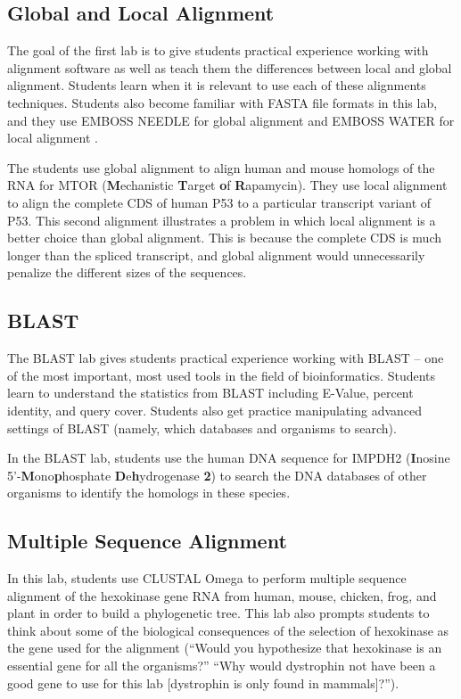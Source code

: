 \documentclass{report}
\begin{document}
\subsection{Global and Local Alignment}
The goal of the first lab is to give students practical experience working with alignment software as well as teach them the differences between local and global alignment. Students learn when it is relevant to use each of these alignments techniques. Students also become familiar with FASTA file formats in this lab, and they use EMBOSS NEEDLE for global alignment and EMBOSS WATER for local alignment \cite{rice2000emboss}.

The students use global alignment to align human and mouse homologs of the RNA for MTOR (\textbf{M}echanistic \textbf{T}arget \textbf{o}f \textbf{R}apamycin). They use local alignment to align the complete CDS of human P53 to a particular transcript variant of P53. This second alignment illustrates a problem in which local alignment is a better choice than global alignment. This is because the complete CDS is much longer than the spliced transcript, and global alignment would unnecessarily penalize the different sizes of the sequences. 

\subsection{BLAST}
The BLAST lab gives students practical experience working with BLAST -- one of the most important, most used tools in the field of bioinformatics. Students learn to understand the statistics from BLAST including E-Value, percent identity, and query cover. Students also get practice manipulating advanced settings of BLAST (namely, which databases and  organisms to search).

In the BLAST lab, students use the human DNA sequence for IMPDH2 (\textbf{I}nosine 5'-\textbf{M}ono\textbf{p}hosphate \textbf{D}e\textbf{h}ydrogenase \textbf{2}) to search the DNA databases of other organisms to identify the homologs in these species.

\subsection{Multiple Sequence Alignment}
In this lab, students use CLUSTAL Omega to perform multiple sequence alignment of the hexokinase gene RNA from human, mouse, chicken, frog, and plant in order to build a phylogenetic tree. This lab also prompts students to think about some of the biological consequences of the selection of hexokinase as the gene used for the alignment (``Would you hypothesize that hexokinase is an essential gene for all the organisms?'' ``Why would dystrophin not have been a good gene to use for this lab [dystrophin is only found in mammals]?'').
\end{document}

